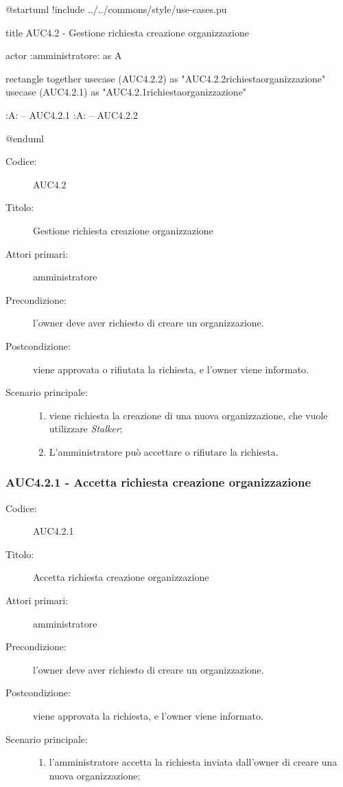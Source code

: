 \documentclass[casi-duso]{subfiles}
\begin{document}
\begin{plantuml}
@startuml
!include ../../commons/style/use-cases.pu

title AUC4.2 - Gestione richiesta creazione organizzazione

actor :amministratore: as A

rectangle {
  together {
    usecase (AUC4.2.2) as "AUC4.2.2\nRifiuta richiesta\ncreazione organizzazione"
    usecase (AUC4.2.1) as "AUC4.2.1\nAccetta richiesta\ncreazione organizzazione"
  }
}

:A: -- AUC4.2.1
:A: -- AUC4.2.2

@enduml
\end{plantuml}

\begin{description}
  \item[Codice:] AUC4.2
  \item[Titolo:] Gestione richiesta creazione organizzazione
  \item[Attori primari:] amministratore
  \item[Precondizione:] l'owner deve aver richiesto di creare un organizzazione.
  \item[Postcondizione:] viene approvata o rifiutata la richiesta, e l'owner viene informato.
  \item[Scenario principale:]
  \begin{enumerate}
    \item viene richiesta la creazione di una nuova organizzazione, che vuole utilizzare \emph{Stalker};
    \item L'amministratore può accettare o rifiutare la richiesta.
  \end{enumerate}
\end{description}

\subsubsection{AUC4.2.1 - Accetta richiesta creazione organizzazione}%
\label{subsub:AUC4.2.1}
\begin{description}
  \item[Codice:] AUC4.2.1
  \item[Titolo:] Accetta richiesta creazione organizzazione
  \item[Attori primari:] amministratore
  \item[Precondizione:] l'owner deve aver richiesto di creare un organizzazione.
  \item[Postcondizione:] viene approvata la richiesta, e l'owner viene informato.
  \item[Scenario principale:]
  \begin{enumerate}
    \item  l'amministratore accetta la richiesta inviata dall'owner di creare una nuova organizzazione;
  \end{enumerate}
\end{description}
\end{document}
